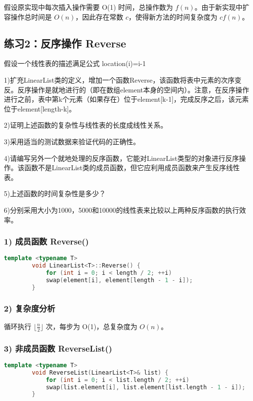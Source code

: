 \documentclass[UTF8]{ctexart}
\begin{document}
	假设原实现中每次插入操作需要 O(1) 时间，总操作数为 $ f(n) $。由于新实现中扩容操作总时间是 $ O(n) $，因此存在常数 $ c $，使得新方法的时间复杂度为 $ cf(n) $。
	\subsection{练习2：反序操作 Reverse}
	
	假设一个线性表的描述满足公式
	location(i)=i-1
	
	1)扩充LinearList类的定义，增加一个函数Reverse，该函数将表中元素的次序变反。反序操作是就地进行的（即在数组element本身的空间内）。注意，在反序操作进行之前，表中第k个元素（如果存在）位于element[k-1]，完成反序之后，该元素位于element[length-k]。
	
	2)证明上述函数的复杂性与线性表的长度成线性关系。
	
	3)采用适当的测试数据来验证代码的正确性。
	
	4)请编写另外一个就地处理的反序函数，它能对LinearList类型的对象进行反序操作。该函数不是LinearList类的成员函数，但它应利用成员函数来产生反序线性表。
	
	5)上述函数的时间复杂性是多少？
	
	6)分别采用大小为1000，5000和10000的线性表来比较以上两种反序函数的执行效率。
	
	\subsubsection{1) 成员函数 Reverse()}
	
	\begin{lstlisting}[language=C++]
		template <typename T>
		void LinearList<T>::Reverse() {
			for (int i = 0; i < length / 2; ++i)
			swap(element[i], element[length - 1 - i]);
		}
	\end{lstlisting}
	\subsubsection{2) 复杂度分析}
	
	循环执行 $ \lfloor \frac{n}{2} \rfloor $ 次，每步为 O(1)，总复杂度为 $ O(n) $。
	\subsubsection{3) 非成员函数 ReverseList()}
	
	\begin{lstlisting}[language=C++]
		template <typename T>
		void ReverseList(LinearList<T>& list) {
			for (int i = 0; i < list.length / 2; ++i)
			swap(list.element[i], list.element[list.length - 1 - i]);
		}
	\end{lstlisting}
\end{document}

